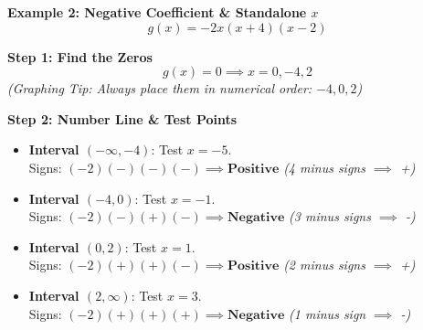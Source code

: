 \documentclass[12pt]{article}
\begin{document}
\vspace{1em}
\textbf{Example 2: Negative Coefficient \& Standalone $x$}
\[
  g(x) = -2x(x+4)(x-2)
\]

\textbf{Step 1: Find the Zeros}
\[
  g(x) = 0 \implies x = 0, -4, 2
\]
\textit{(Graphing Tip: Always place them in numerical order: $-4, 0, 2$)}

\textbf{Step 2: Number Line \& Test Points}
\begin{itemize}
  \item \textbf{Interval $(-\infty, -4)$}: Test $x = -5$. \\
  Signs: $(-2)(-)(-) (-) \implies \textbf{Positive}$ \quad \textit{(4 minus signs $\implies$ +)}
  
  \item \textbf{Interval $(-4, 0)$}: Test $x = -1$. \\
  Signs: $(-2)(-)(+) (-) \implies \textbf{Negative}$ \quad \textit{(3 minus signs $\implies$ -)}
  
  \item \textbf{Interval $(0, 2)$}: Test $x = 1$. \\
  Signs: $(-2)(+)(+) (-) \implies \textbf{Positive}$ \quad \textit{(2 minus signs $\implies$ +)}
  
  \item \textbf{Interval $(2, \infty)$}: Test $x = 3$. \\
  Signs: $(-2)(+)(+) (+) \implies \textbf{Negative}$ \quad \textit{(1 minus sign $\implies$ -)}
\end{itemize}
\end{document}
